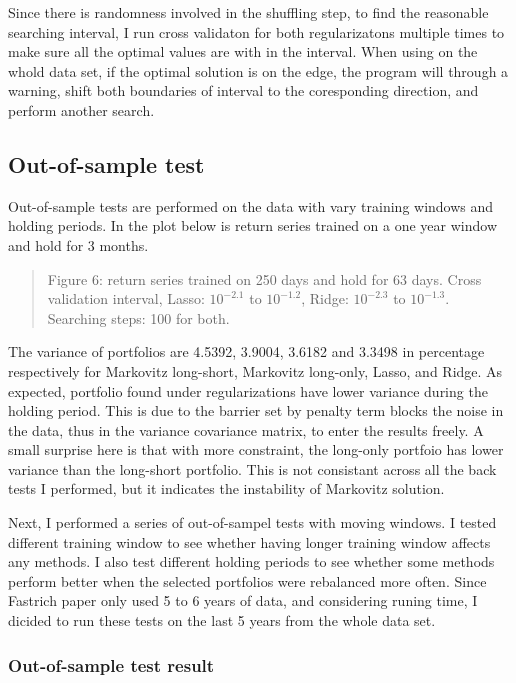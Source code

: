\documentclass{article}
\newcommand{\ciapdf}[1]{\vspace*{-\parskip}\begin{center}\resizebox{0.75\textwidth}{!}{\texttt{[image: \#1]}}\end{center}}
\begin{document}
Since there is randomness involved in the shuffling step, to find the reasonable
searching interval, I run cross validaton for both regularizatons multiple times
to make sure all the optimal values are with in the interval. When using on
the whold data set, if the optimal solution is on the edge, the program will
through a warning, shift both boundaries of interval to the coresponding
direction, and perform another search.

\subsection*{Out-of-sample test}

Out-of-sample tests are performed on the data with vary training windows and
holding periods. In the plot below is return series trained on a one year
window and hold for 3 months.


\ciapdf{Figure_6T2.pdf}

\begin{quote}
Figure 6: return series trained on 250 days and hold for 63 days. Cross validation
interval, Lasso: $10^{-2.1}$ to $10^{-1.2}$, Ridge: $10^{-2.3}$ to $10^{-1.3}$.
Searching steps: 100 for both.
\end{quote}

The variance of portfolios are 4.5392, 3.9004, 3.6182 and 3.3498 in percentage
respectively
for Markovitz long-short, Markovitz long-only, Lasso, and Ridge. As expected,
portfolio found under regularizations have lower variance during the holding
period. This is due to the barrier set by penalty term blocks the noise in the
data, thus in the variance covariance matrix, to enter the results freely. A
small surprise here is that with more constraint, the long-only portfoio
has lower variance than the long-short portfolio. This is not consistant across
all the back tests I performed, but it indicates the instability of Markovitz
solution.

Next, I performed a series of out-of-sampel tests with moving windows. I tested
different training window to see whether having longer training window affects
any methods. I also test different holding periods to see whether some methods
perform better when the selected portfolios were rebalanced more often. Since
Fastrich paper only used 5 to 6 years of data, and considering runing time, I
dicided to run these tests on the last 5 years from the whole data set.


\subsubsection*{\centering{}Out-of-sample test result}
\end{document}
